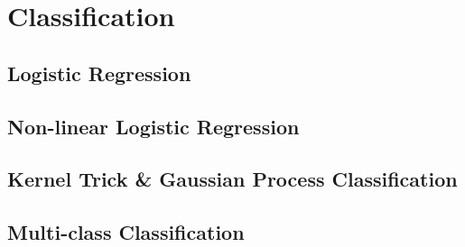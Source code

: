 
\chapter{Classification}
\label{chapter5}

\section{Logistic Regression}

\section{Non-linear Logistic Regression}

\section{Kernel Trick \& Gaussian Process Classification}

\section{Multi-class Classification}